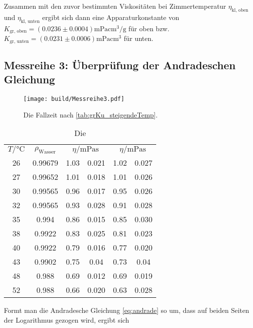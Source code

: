 Zusammen mit den zuvor bestimmten Viskositäten bei Zimmertemperatur $\eta_{\text{kl, oben}}$ und $\eta_{\text{kl, unten}}$ ergibt sich dann eine Apparaturkonstante von
$K_{\text{gr, oben}} = \left(0.0236 \pm 0.0004 \right) \unit{\milli\Pa \cubic\cm\per\g}$ für oben bzw.
$K_{\text{gr, unten}} = \left(0.0231 \pm 0.0006 \right) \unit{\milli\Pa \cubic\cm}$ für unten.




\subsection[]{Messreihe 3: Überprüfung der Andradeschen Gleichung}
\begin{figure}
    \centering
    \texttt{[image: build/Messreihe3.pdf]}
    \caption{Die Fallzeit nach \ref{tab:grKu_steigendeTemp}.}
    \label{fig:groKu_steigendeTemp}
\end{figure}

\begin{table}
    \centering
    \begin{tabular}[]{S[table-format=2.0] S[table-format=0.5] S @{${}\pm{}$} S[table-format=1.3] S @{${}\pm{}$} S[table-format=1.3]}
        \toprule
        {$T /\unit{\celsius}$} & {$\rho_{\text{Wasser}}$ \cite{geschke}} &  &  \\
            26  &  0.99679   & 1.03  & 0.021 &        1.02 & 0.027  \\
            27  &  0.99652   & 1.01  & 0.018 &        1.01 & 0.026  \\
            30  &  0.99565   & 0.96  & 0.017 &        0.95 & 0.026  \\
            32  &  0.99565   & 0.93  & 0.028 &        0.91 & 0.028  \\
            35  &  0.994     & 0.86  & 0.015 &        0.85 & 0.030  \\
            38  &  0.9922    & 0.83  & 0.025 &        0.81 & 0.023  \\
            40  &  0.9922    & 0.79  & 0.016 &        0.77 & 0.020  \\
            43  &  0.9902    & 0.75  & 0.04  &        0.73 & 0.04   \\
            48  &  0.988     & 0.69  & 0.012 &        0.69 & 0.019  \\
            52  &  0.988     & 0.66  & 0.020 &        0.63 & 0.028  \\
    \end{tabular}
    \caption{Die }
\end{table}
Formt man die Andradesche Gleichung \eqref{eq:andrade} so um, dass auf beiden Seiten der Logarithmus gezogen wird, ergibt sich

